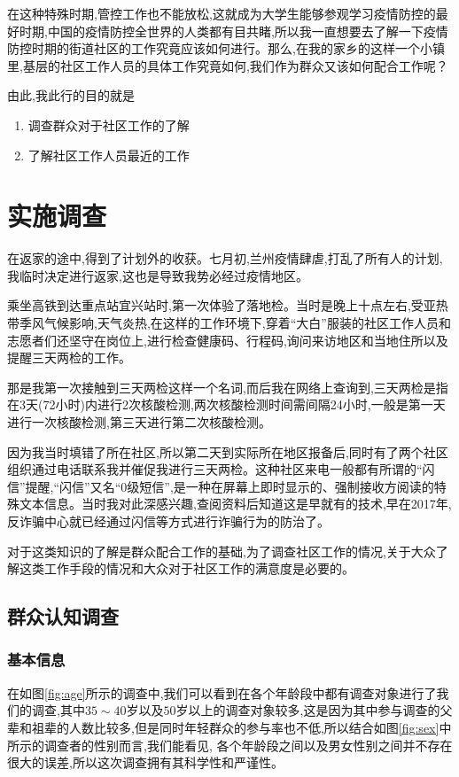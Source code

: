 \documentclass[AutoFakeBold]{LZUThesis}
\begin{document}
在这种特殊时期,管控工作也不能放松,这就成为大学生能够参观学习疫情防控的最好时期,中国的疫情防控全世界的人类都有目共睹,所以我一直想要去了解一下疫情防控时期的街道社区的工作究竟应该如何进行。那么,在我的家乡的这样一个小镇里,基层的社区工作人员的具体工作究竟如何,我们作为群众又该如何配合工作呢？

由此,我此行的目的就是

\begin{enumerate}
    \item 调查群众对于社区工作的了解
    \item 了解社区工作人员最近的工作
\end{enumerate}

\chapter{实施调查}

在返家的途中,得到了计划外的收获。七月初,兰州疫情肆虐,打乱了所有人的计划,我临时决定进行返家,这也是导致我势必经过疫情地区。

乘坐高铁到达重点站宜兴站时,第一次体验了落地检。当时是晚上十点左右,受亚热带季风气候影响,天气炎热,在这样的工作环境下,穿着“大白”服装的社区工作人员和志愿者们还坚守在岗位上,进行检查健康码、行程码,询问来访地区和当地住所以及提醒三天两检的工作。

那是我第一次接触到三天两检这样一个名词,而后我在网络上查询到,三天两检是指在3天(72小时)内进行2次核酸检测,两次核酸检测时间需间隔24小时,一般是第一天进行一次核酸检测,第三天进行第二次核酸检测。

因为我当时填错了所在社区,所以第二天到实际所在地区报备后,同时有了两个社区组织通过电话联系我并催促我进行三天两检。这种社区来电一般都有所谓的“闪信”提醒,“闪信”又名“0级短信”,是一种在屏幕上即时显示的、强制接收方阅读的特殊文本信息。当时我对此深感兴趣,查阅资料后知道这是早就有的技术,早在2017年,反诈骗中心就已经通过闪信等方式进行诈骗行为的防治了。

对于这类知识的了解是群众配合工作的基础,为了调查社区工作的情况,关于大众了解这类工作手段的情况和大众对于社区工作的满意度是必要的。

\section{群众认知调查}

\subsection{基本信息}

在如图\ref{fig:age}所示的调查中,我们可以看到在各个年龄段中都有调查对象进行了我们的调查,其中$35 \sim 40$岁以及$50$岁以上的调查对象较多,这是因为其中参与调查的父辈和祖辈的人数比较多,但是同时年轻群众的参与率也不低,所以结合如图\ref{fig:sex}中所示的调查者的性别而言,我们能看见, 各个年龄段之间以及男女性别之间并不存在很大的误差,所以这次调查拥有其科学性和严谨性。
\end{document}

